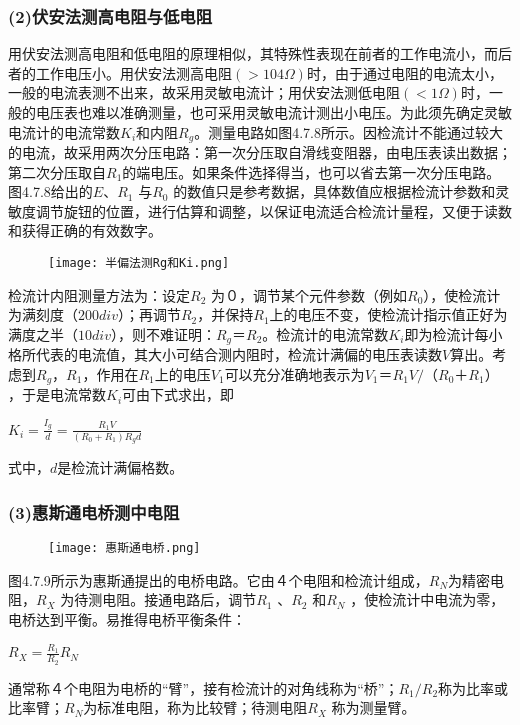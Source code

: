 \documentclass[11pt,a4paper,oneside]{article}
\begin{document}
\subsubsection*{(2)伏安法测高电阻与低电阻}
用伏安法测高电阻和低电阻的原理相似，其特殊性表现在前者的工作电流小，而后者的工作电压小。用伏安法测高电阻$(>104\Omega) $时，由于通过电阻的电流太小，一般的电流表测不出来，故采用灵敏电流计；用伏安法测低电阻$(<1\Omega) $时，一般的电压表也难以准确测量，也可采用灵敏电流计测出小电压。为此须先确定灵敏电流计的电流常数$K_i$和内阻$R_g$。测量电路如图4.7.8所示。因检流计不能通过较大的电流，故采用两次分压电路：第一次分压取自滑线变阻器，由电压表读出数据；第二次分压取自$R_1$的端电压。如果条件选择得当，也可以省去第一次分压电路。图4.7.8给出的$E$、$R_1$ 与$R_0$ 的数值只是参考数据，具体数值应根据检流计参数和灵敏度调节旋钮的位置，进行估算和调整，以保证电流适合检流计量程，又便于读数和获得正确的有效数字。

\begin{figure}[htbp]
\centering
  \texttt{[image: 半偏法测Rg和Ki.png]}
\end{figure}

检流计内阻测量方法为：设定$R_2$ 为０，调节某个元件参数（例如$R_0$），使检流计为满刻度（$200div$）；再调节$R_2$，并保持$R_1$上的电压不变，使检流计指示值正好为满度之半（$10div$），则不难证明：$R_g＝R_2$。检流计的电流常数$K_i$即为检流计每小格所代表的电流值，其大小可结合测内阻时，检流计满偏的电压表读数$V$算出。考虑到$R_g$，$R_1$，作用在$R_1$上的电压$V_1$可以充分准确地表示为$V_1＝R_1V/（R_0＋R_1）$，于是电流常数$K_i$可由下式求出，即
\begin{center}
$K_i=\displaystyle\frac{I_g}{d}=\displaystyle\frac{R_1V}{(R_0+R_1)R_gd}$
\end{center}
式中，$d$是检流计满偏格数。

\subsubsection*{(3)惠斯通电桥测中电阻}
\begin{figure}[htbp]
\centering
  \texttt{[image: 惠斯通电桥.png]}
\end{figure}
图4.7.9所示为惠斯通提出的电桥电路。它由４个电阻和检流计组成，$R_N$为精密电阻，$R_X$ 为待测电阻。接通电路后，调节$R_1$ 、$R_2$  和$R_N$ ，使检流计中电流为零，电桥达到平衡。易推得电桥平衡条件：
\begin{center}
$R_X=\displaystyle\frac{R_1}{R_2}R_N$
\end{center}
通常称４个电阻为电桥的“臂”，接有检流计的对角线称为“桥”；$R_1/R_2$称为比率或比率臂；$R_N$为标准电阻，称为比较臂；待测电阻$R_X$ 称为测量臂。
\end{document}
